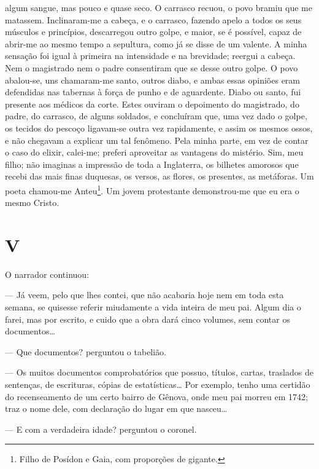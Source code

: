 algum sangue, mas pouco e quase seco. O carrasco recuou, o povo bramiu
que me matassem. Inclinaram-me a cabeça, e o carrasco, fazendo apelo a
todos os seus músculos e princípios, descarregou outro golpe, e maior,
se é possível, capaz de abrir-me ao mesmo tempo a sepultura, como já se
disse de um valente. A minha sensação foi igual à primeira na
intensidade e na brevidade; reergui a cabeça. Nem o magistrado nem o
padre consentiram que se desse outro golpe. O povo abalou-se, uns
chamaram-me santo, outros diabo, e ambas essas opiniões eram defendidas
nas tabernas à força de punho e de aguardente. Diabo ou santo, fui
presente aos médicos da corte. Estes ouviram o depoimento do magistrado,
do padre, do carrasco, de alguns soldados, e concluíram que, uma vez
dado o golpe, os tecidos do pescoço ligavam-se outra vez rapidamente, e
assim os mesmos ossos, e não chegavam a explicar um tal fenômeno. Pela
minha parte, em vez de contar o caso do elixir, calei-me; preferi
aproveitar as vantagens do mistério. Sim, meu filho; não imaginas a
impressão de toda a Inglaterra, os bilhetes amorosos que recebi das mais
finas duquesas, os versos, as flores, os presentes, as metáforas. Um
poeta chamou-me Anteu\footnote{Filho de Posídon e Gaia, com proporções
  de gigante.}. Um jovem protestante demonstrou-me que eu era o mesmo
Cristo.



\section*{V}



O narrador continuou:

--- Já veem, pelo que lhes contei, que não acabaria hoje nem em toda
esta semana, se quisesse referir miudamente a vida inteira de meu pai.
Algum dia o farei, mas por escrito, e cuido que a obra dará cinco
volumes, sem contar os documentos\ldots{}

--- Que documentos? perguntou o tabelião.

--- Os muitos documentos comprobatórios que possuo, títulos, cartas,
traslados de sentenças, de escrituras, cópias de estatísticas\ldots{} Por
exemplo, tenho uma certidão do recenseamento de um certo bairro de
Gênova, onde meu pai morreu em 1742; traz o nome dele, com declaração do
lugar em que nasceu\ldots{}

--- E com a verdadeira idade? perguntou o coronel.

